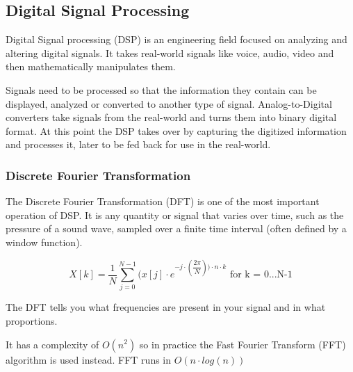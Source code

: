\subsection{Digital Signal Processing}
Digital Signal processing (DSP) is an engineering field focused on analyzing and altering digital signals. It takes real-world signals like voice, audio, video and then mathematically manipulates them. \cite{dsp} \par

Signals need to be processed so that the information they contain can be displayed, analyzed or converted to another type of signal. Analog-to-Digital converters take signals from the real-world and turns them into binary digital format. At this point the DSP takes over by capturing the digitized information and processes it, later to be fed back for use in the real-world. \par

\subsubsection{Discrete Fourier Transformation}
The Discrete Fourier Transformation (DFT) is one of the most important operation of DSP. It is any quantity or signal that varies over time, such as the pressure of a sound wave, sampled over a finite time interval (often defined by a window function). \cite{discrete} \par

\begin{equation}
X[k] = \dfrac{1}{N} \sum_{j=0}^{N-1}(x[j] \cdot e^ {-j \cdot( \dfrac{2\pi}{N}) ) \cdot n \cdot k }  \text{ for k = 0...N-1}
\end{equation}

The DFT tells you what frequencies are present in your signal and in what proportions.
\par
It has a complexity of $O(n^2)$ so in practice the Fast Fourier Transform (FFT) algorithm is used instead. FFT runs in $O(n\cdot log(n))$